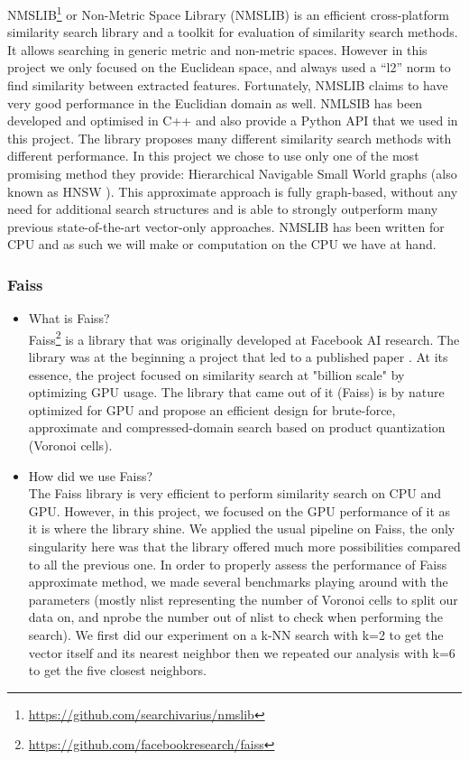 \documentclass[a4paper]{article}
\begin{document}
NMSLIB\footnote{\url{https://github.com/searchivarius/nmslib}} or Non-Metric Space Library (NMSLIB) is an efficient cross-platform similarity search library and a toolkit for evaluation of similarity search methods. It allows searching in generic metric and non-metric spaces. However in this project we only focused on the Euclidean space, and always used a “l2” norm to find similarity between extracted features. Fortunately, NMSLIB claims to have very good performance in the Euclidian domain as well. NMLSIB has been developed and optimised in C++ and also provide a Python API that we used in this project. The library proposes many different similarity search methods with different performance. In this project we chose to use only one of the most promising method they provide: Hierarchical Navigable Small World graphs (also known as HNSW \cite{HNSW}). This approximate approach is fully graph-based, without any need for additional search structures and is able to strongly outperform many previous state-of-the-art vector-only approaches. NMSLIB has been written for CPU and as such we will make or computation on the CPU we have at hand.

\subsubsection{Faiss}
\begin{itemize}
	\item What is Faiss? \vspace{5pt} \\

Faiss\footnote{\url{https://github.com/facebookresearch/faiss}} is a library that was originally developed at Facebook AI research. The library was at the beginning a project that led to a published paper \cite{faiss}. At its essence, the project focused on similarity search at "billion scale" by optimizing GPU usage. The library that came out of it (Faiss) is by nature optimized for GPU and propose an efficient design for brute-force, approximate and compressed-domain search based on product quantization (Voronoi cells).

	\item How did we use Faiss? \vspace{5pt} \\

The Faiss library is very efficient to perform similarity search on CPU and GPU. However, in this project, we focused on the GPU performance of it as it is where the library shine. We applied the usual pipeline on Faiss, the only singularity here was that the library offered much more possibilities compared to all the previous one. In order to properly assess the performance of Faiss approximate method, we made several benchmarks playing around with the parameters (mostly nlist representing the number of Voronoi cells to split our data on, and nprobe the number out of nlist to check when performing the search). We first did our experiment on a k-NN search with k=2 to get the vector itself and its nearest neighbor then we repeated our analysis with k=6 to get the five closest neighbors.
\end{itemize}
\end{document}
